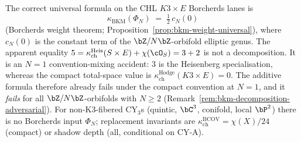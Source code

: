\begin{remark}
\label{rem:kappa-bps-universality-vol3}
The correct universal formula on the CHL \(K3\times E\) Borcherds lanes is
\begin{equation}\label{eq:kappa-bkm-universal-k3e}
\kappa_{\mathrm{BKM}}(\Phi_N)
\;=\;
\tfrac{1}{2}\,c_N(0)
\end{equation}
\textup{(}Borcherds weight theorem;
Proposition~\textup{\ref{prop:bkm-weight-universal})},
where $c_N(0)$ is the constant term of the $\bZ/N\bZ$-orbifold
elliptic genus. The apparent equality
$5 = \kappa_{\mathrm{ch}}^{\mathrm{Heis}}(S \times E) + \chi(\cO_S) = 3 + 2$
is not a decomposition. It is an $N = 1$ convention-mixing accident:
$3$ is the Heisenberg specialisation, whereas the compact total-space
value is $\kappa_{\mathrm{ch}}^{\mathrm{Hodge}}(K3 \times E)=0$. The additive formula
therefore already fails under the compact convention at $N=1$, and it
\emph{fails} for all $\bZ/N\bZ$-orbifolds with $N \geq 2$
\textup{(}Remark~\textup{\ref{rem:bkm-decomposition-adversarial}}\textup{)}.
For non-K3-fibered CY$_3$s \textup{(}quintic, $\bC^3$,
conifold, local $\bP^2$\textup{)} there is no Borcherds input
\(\Phi_N\); replacement invariants are
$\kappa_{\mathrm{ch}}^{\mathrm{BCOV}}=\chi(X)/24$
\textup{(}compact\textup{)} or shadow depth
\textup{(}all, conditional on CY-A\textup{)}.
\end{remark}

